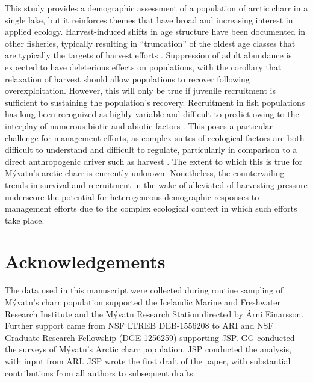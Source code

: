 \documentclass[11pt]{article}
\begin{document}
This study provides a demographic assessment of a population of arctic charr in a single lake,
but it reinforces themes that have broad and increasing interest in applied ecology.
Harvest-induced shifts in age structure have been documented in other fisheries,
typically resulting in ``truncation'' of the oldest age classes 
that are typically the targets of harvest efforts
\citep{hsieh2010fishing}.
Suppression of adult abundance is expected to have deleterious effects on populations,
with the corollary that relaxation of harvest should allow populations 
to recover following overexploitation.
However, this will only be true if juvenile recruitment is sufficient 
to sustaining the population's recovery.
Recruitment in fish populations 
has long been recognized as highly variable and difficult to predict
owing to the interplay of numerous biotic and abiotic factors 
\citep{dixon1999episodic, houde2008emerging, ludsin2014physical}.
This poses a particular challenge for management efforts, 
as complex suites of ecological factors are both difficult to understand 
and difficult to regulate, 
particularly in comparison to a direct anthropogenic driver such as harvest
\citep{beamish1999taking, link2002does}.
The extent to which this is true for M\'{y}vatn's arctic charr is currently unknown.
Nonetheless, 
the countervailing trends in survival and recruitment 
in the wake of alleviated of harvesting pressure
underscore the potential for heterogeneous demographic responses to management efforts
due to the complex ecological context in which such efforts take place.






\section*{Acknowledgements} 

The data used in this manuscript were collected during routine sampling 
of M\'{y}vatn’s charr population supported the Icelandic Marine and Freshwater Research Institute 
and the Mývatn Research Station directed by \'{A}rni Einarsson. 
Further support came from NSF LTREB DEB-1556208 to ARI and 
NSF Graduate Research Fellowship (DGE-1256259) supporting JSP.
GG conducted the surveys of Mývatn’s Arctic charr population. 
JSP conducted the analysis, 
with input from ARI. 
JSP wrote the first draft of the paper, 
with substantial contributions from all authors to subsequent drafts.
\end{document}
